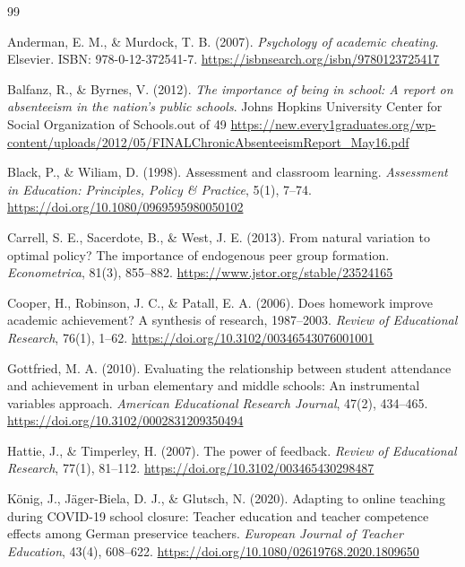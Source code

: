 \documentclass[]{article}
\begin{document}
	\begin{thebibliography}{99}
		
		Anderman, E. M., \& Murdock, T. B. (2007). \textit{Psychology of academic cheating}. Elsevier. ISBN: 978-0-12-372541-7. \href{https://isbnsearch.org/isbn/9780123725417}{https://isbnsearch.org/isbn/9780123725417}
		
		Balfanz, R., \& Byrnes, V. (2012). \textit{The importance of being in school: A report on absenteeism in the nation's public schools}. Johns Hopkins University Center for Social Organization of Schools.out of 49  \href{https://new.every1graduates.org/wp-content/uploads/2012/05/FINALChronicAbsenteeismReport_May16.pdf}{https://new.every1graduates.org/wp-content/uploads/2012/05/FINALChronicAbsenteeismReport\_May16.pdf}
		
		Black, P., \& Wiliam, D. (1998). Assessment and classroom learning. \textit{Assessment in Education: Principles, Policy \& Practice}, 5(1), 7--74. \href{https://doi.org/10.1080/0969595980050102}{https://doi.org/10.1080/0969595980050102}
		
		Carrell, S. E., Sacerdote, B., \& West, J. E. (2013). From natural variation to optimal policy? The importance of endogenous peer group formation. \textit{Econometrica}, 81(3), 855--882. \href{https://www.jstor.org/stable/23524165}{https://www.jstor.org/stable/23524165}
		
		Cooper, H., Robinson, J. C., \& Patall, E. A. (2006). Does homework improve academic achievement? A synthesis of research, 1987--2003. \textit{Review of Educational Research}, 76(1), 1--62. \href{https://doi.org/10.3102/00346543076001001}{https://doi.org/10.3102/00346543076001001}
		
		Gottfried, M. A. (2010). Evaluating the relationship between student attendance and achievement in urban elementary and middle schools: An instrumental variables approach. \textit{American Educational Research Journal}, 47(2), 434--465. \href{https://doi.org/10.3102/0002831209350494}{https://doi.org/10.3102/0002831209350494}
		
		Hattie, J., \& Timperley, H. (2007). The power of feedback. \textit{Review of Educational Research}, 77(1), 81--112. \href{https://doi.org/10.3102/003465430298487}{https://doi.org/10.3102/003465430298487}
		
		König, J., Jäger-Biela, D. J., \& Glutsch, N. (2020). Adapting to online teaching during COVID-19 school closure: Teacher education and teacher competence effects among German preservice teachers. \textit{European Journal of Teacher Education}, 43(4), 608--622. \href{https://doi.org/10.1080/02619768.2020.1809650}{https://doi.org/10.1080/02619768.2020.1809650}
		

\end{thebibliography}
\end{document}
